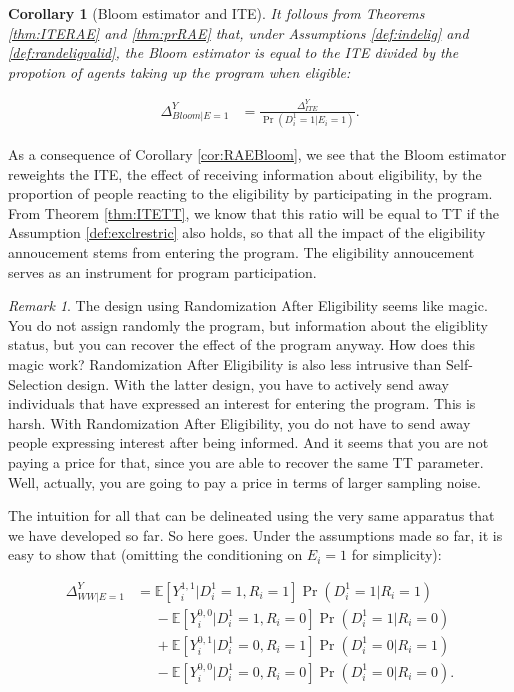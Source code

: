 \documentclass[
]{book}
\newcommand{\esp}[1]{\mathbb{E}[ #1 ]}
\newtheorem{corollary}{Corollary}[chapter]
\theoremstyle{definition}
\theoremstyle{definition}
\theoremstyle{definition}
\theoremstyle{definition}
\theoremstyle{remark}
\newtheorem*{remark}{Remark}
\begin{document}
\begin{corollary}[Bloom estimator and ITE]
\protect\hypertarget{cor:RAEBloom}{}{\label{cor:RAEBloom} \iffalse (Bloom estimator and ITE) \fi{} }It follows from Theorems \ref{thm:ITERAE} and \ref{thm:prRAE} that, under Assumptions \ref{def:indelig} and \ref{def:randeligvalid}, the Bloom estimator is equal to the ITE divided by the propotion of agents taking up the program when eligible:

\begin{align*}
  \Delta^Y_{Bloom|E=1} & = \frac{\Delta^Y_{ITE}}{\Pr(D^1_i=1|E_i=1)}.
\end{align*}
\end{corollary}

As a consequence of Corollary \ref{cor:RAEBloom}, we see that the Bloom estimator reweights the ITE, the effect of receiving information about eligibility, by the proportion of people reacting to the eligibility by participating in the program.
From Theorem \ref{thm:ITETT}, we know that this ratio will be equal to TT if the Assumption \ref{def:exclrestric} also holds, so that all the impact of the eligibility annoucement stems from entering the program.
The eligibility annoucement serves as an instrument for program participation.

\begin{remark}
\iffalse{} {Remark. } \fi{}The design using Randomization After Eligibility seems like magic.
You do not assign randomly the program, but information about the eligiblity status, but you can recover the effect of the program anyway.
How does this magic work?
Randomization After Eligibility is also less intrusive than Self-Selection design.
With the latter design, you have to actively send away individuals that have expressed an interest for entering the program.
This is harsh.
With Randomization After Eligibility, you do not have to send away people expressing interest after being informed.
And it seems that you are not paying a price for that, since you are able to recover the same TT parameter.
Well, actually, you are going to pay a price in terms of larger sampling noise.
\end{remark}
The intuition for all that can be delineated using the very same apparatus that we have developed so far.
So here goes.
Under the assumptions made so far, it is easy to show that (omitting the conditioning on \(E_i=1\) for simplicity):

\begin{align*}
  \Delta^Y_{WW|E=1} & = \esp{Y_i^{1,1}|D_i^1=1,R_i=1}\Pr(D^1_i=1|R_i=1)\\
                    & \phantom{=}-\esp{Y_i^{0,0}|D_i^1=1,R_i=0}\Pr(D^1_i=1|R_i=0) \\
                    & \phantom{=}+ \esp{Y_i^{0,1}|D_i^1=0,R_i=1}\Pr(D^1_i=0|R_i=1)\\
                    & \phantom{=}-\esp{Y_i^{0,0}|D_i^1=0,R_i=0}\Pr(D^1_i=0|R_i=0).  
\end{align*}
\end{document}
